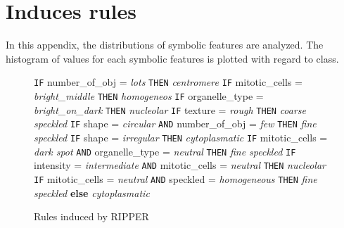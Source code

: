 
\chapter{Induces rules} %

\label{AppendixB} %


In this appendix, the distributions of symbolic features are analyzed. The histogram of values for each symbolic features is plotted with regard to class.



\begin{figure}
	\caption{Rules induced by RIPPER }
	\label{fig:RulesRIPPER}
	\small
	\centering
	
		\begin{algorithmic}[1]
			\State \texttt{IF} number\_of\_obj = \textit{lots} 
			\Statex \texttt{THEN} \textit{centromere}
			\State \texttt{IF} mitotic\_cells = \textit{bright\_middle} 
			\Statex \texttt{THEN} \textit{homogeneos}
			\State \texttt{IF} organelle\_type = \textit{bright\_on\_dark} 
			\Statex \texttt{THEN} \textit{nucleolar}
			\State \texttt{IF} texture = \textit{rough} 
			\Statex \texttt{THEN} \textit{coarse speckled}
			\State \texttt{IF} shape = \textit{circular}  \texttt{AND} number\_of\_obj = \textit{few}
			\Statex \texttt{THEN} \textit{fine speckled}
			\State \texttt{IF} shape = \textit{irregular} 
			\Statex \texttt{THEN} \textit{cytoplasmatic}
			\State \texttt{IF} mitotic\_cells = \textit{dark spot} \texttt{AND} organelle\_type = \textit{neutral} 
			\Statex \texttt{THEN} \textit{fine speckled}
			\State \texttt{IF} intensity = \textit{intermediate} \texttt{AND} mitotic\_cells = \textit{neutral} 
			\Statex \texttt{THEN} \textit{nucleolar}
			\State \texttt{IF} mitotic\_cells = \textit{neutral} \texttt{AND} speckled = \textit{homogeneous} 
			\Statex \texttt{THEN} \textit{fine speckled}
			\State \textbf{else} \textit{cytoplasmatic}
		\end{algorithmic}
	
\end{figure}


